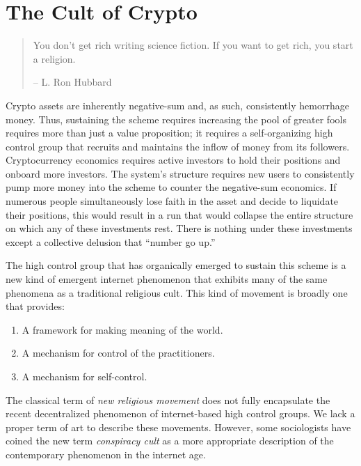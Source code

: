 \chapter{The Cult of Crypto}

\begin{quote}
You don't get rich writing science fiction. If you want to get rich, you start a
religion.
\begin{flushright}
-- L. Ron Hubbard
\end{flushright}
\end{quote}


Crypto assets are inherently negative-sum and, as such, consistently hemorrhage
money. Thus, sustaining the scheme requires increasing the pool of greater fools
requires more than just a value proposition; it requires a self-organizing high
control group that recruits and maintains the inflow of money from its
followers. Cryptocurrency economics requires active investors to hold their
positions and onboard more investors. The system's structure requires new users
to consistently pump more money into the scheme to counter the negative-sum
economics. If numerous people simultaneously lose faith in the asset and decide
to liquidate their positions, this would result in a run that would collapse the
entire structure on which any of these investments rest. There is nothing under
these investments except a collective delusion that ``number go up.''

The high control group that has organically emerged to sustain this scheme is a
new kind of emergent internet phenomenon that exhibits many of the same
phenomena as a traditional religious cult. This kind of movement is broadly one
that provides:

\begin{enumerate}
  \item A framework for making meaning of the world.
  \item A mechanism for control of the practitioners.
  \item A mechanism for self-control.
\end{enumerate}

The classical term of \textit{new religious movement} does not fully encapsulate
the recent decentralized phenomenon of internet-based high control groups. We
lack a proper term of art to describe these movements. However, some
sociologists have coined the new term \textit{conspiracy cult} as a more
appropriate description of the contemporary phenomenon in the internet age.

